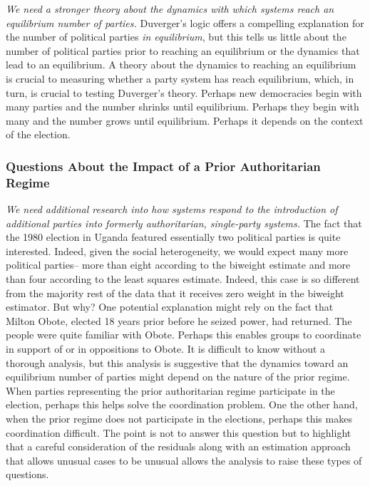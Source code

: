 \documentclass[12pt]{article}
\begin{document}
\textit{We need a stronger theory about the dynamics with which systems reach an equilibrium number of parties.} Duverger's logic offers a compelling explanation for the number of political parties \textit{in equilibrium}, but this tells us little about the number of political parties prior to reaching an equilibrium or the dynamics that lead to an equilibrium. A theory about the dynamics to reaching an equilibrium is crucial to measuring whether a party system has reach equilibrium, which, in turn, is crucial to testing Duverger's theory. Perhaps new democracies begin with many parties and the number shrinks until equilibrium. Perhaps they begin with many and the number grows until equilibrium. Perhaps it depends on the context of the election.

\subsubsection*{Questions About the Impact of a Prior Authoritarian Regime}

\textit{We need additional research into how systems respond to the introduction of additional parties into formerly authoritarian, single-party systems.} The fact that the 1980 election in Uganda featured essentially two political parties is quite interested. Indeed, given the social heterogeneity, we would expect many more political parties-- more than eight according to the biweight estimate and more than four according to the least squares estimate. Indeed, this case is so different from the majority rest of the data that it receives zero weight in the biweight estimator. But why? One potential explanation might rely on the fact that Milton Obote, elected 18 years prior before he seized power, had returned. The people were quite familiar with Obote. Perhaps this enables groups to coordinate in support of or in oppositions to Obote. It is difficult to know without a thorough analysis, but this analysis is suggestive that the dynamics toward an equilibrium number of parties might depend on the nature of the prior regime. When parties representing the prior authoritarian regime participate in the election, perhaps this helps solve the coordination problem. One the other hand, when the prior regime does not participate in the elections, perhaps this makes coordination difficult. The point is not to answer this question but to highlight that a careful consideration of the residuals along with an estimation approach that allows unusual cases to be unusual allows the analysis to raise these types of questions.
\end{document}
